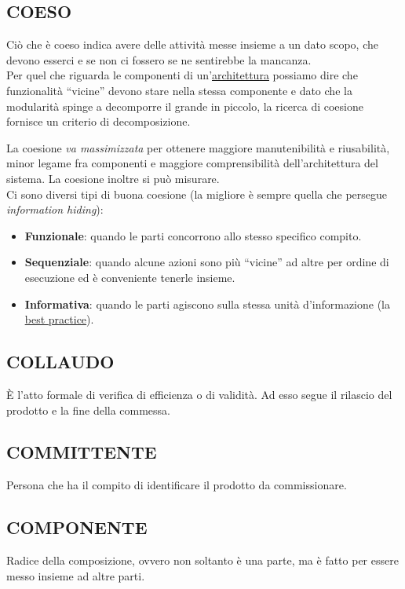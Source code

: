 		\subsection{COESO}  \label{coeso}
		Ciò che è coeso indica avere delle attività messe insieme a un dato scopo, che devono esserci e se non ci fossero se ne sentirebbe la mancanza.  \\
		Per quel che riguarda le componenti di un'\underline{\hyperref[architettura]{architettura}} possiamo dire che funzionalità ``vicine'' devono stare nella stessa componente e dato che la modularità spinge a decomporre il grande in piccolo, la ricerca di coesione fornisce un criterio di decomposizione. \par
		La coesione \emph{va massimizzata} per ottenere maggiore manutenibilità e riusabilità, minor legame fra componenti e maggiore comprensibilità dell’architettura del sistema. La coesione inoltre si può misurare. \\
		Ci sono diversi tipi di buona coesione (la migliore è sempre quella che persegue \textit{information hiding}):
			\begin{itemize}
				\item \textbf{Funzionale}: quando le parti concorrono allo stesso specifico compito.
				\item \textbf{Sequenziale}: quando alcune azioni sono più ``vicine'' ad altre per ordine di esecuzione ed è conveniente tenerle insieme.
				\item \textbf{Informativa}: quando le parti agiscono sulla stessa unità d'informazione
				(la \underline{\hyperref[best]{best practice}}).
			\end{itemize}

		\subsection{COLLAUDO}		\label{collaudo}
		È l'atto formale di verifica di efficienza o di validità.  Ad esso segue il rilascio del prodotto e la fine della commessa.

		\subsection{COMMITTENTE}  \label{committente}
		Persona che ha il compito di identificare il prodotto da commissionare.

		\subsection{COMPONENTE}  \label{componente}
		Radice della composizione, ovvero non soltanto è una parte, ma è fatto per essere messo insieme ad altre parti.


